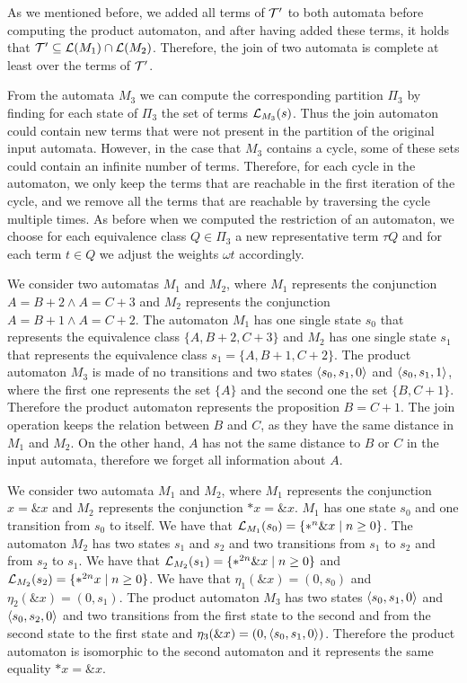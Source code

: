 As we mentioned before, we added all terms of $\mathcal{T}'$ to both automata before computing the product automaton, and after having added these terms, it holds that $\mathcal{T}' \subseteq \mathcal{L}(M_1) \cap \mathcal{L}(M_2)$.
Therefore, the join of two automata is complete at least over the terms of $\mathcal{T}'$.

From the automata $M_3$ we can compute the corresponding partition $\Pi_3$ by finding for each state of $\Pi_3$ the set of terms $\mathcal{L}_{M_3}(s)$.
Thus the join automaton could contain new terms that were not present in the partition of the original input automata.
However, in the case that $M_3$ contains a cycle, some of these sets could contain an infinite number of terms.
Therefore, for each cycle in the automaton, we only keep the terms that are reachable in the first iteration of the cycle, and we remove all the terms that are reachable by traversing the cycle multiple times.
As before when we computed the restriction of an automaton, we choose for each equivalence class $Q\in \Pi_3$ a new representative term $\tau Q$ and for each term $t \in Q$ we adjust the weights $\omega t$ accordingly.

\begin{example}
    We consider two automatas $M_1$ and $M_2$, where $M_1$ represents the conjunction $A = B + 2 \land A = C + 3$ and $M_2$ represents the conjunction $A = B + 1 \land A = C + 2$.
    The automaton $M_1$ has one single state $s_0$ that represents the equivalence class $\{A, B+2, C+3\}$
    and $M_2$ has one single state $s_1$ that represents the equivalence class $s_1 = \{A, B+1, C+2\}$.
    The product automaton $M_3$ is made of no transitions and two states $\langle s_0, s_1, 0\rangle$ and $\langle s_0, s_1, 1\rangle$, where the first one represents the set $\{A\}$ and the second one the set $\{B, C+1\}$.
    Therefore the product automaton represents the proposition $B = C + 1$.
    The join operation keeps the relation between $B$ and $C$, as they have the same distance in $M_1$ and $M_2$.
    On the other hand, $A$ has not the same distance to $B$ or $C$ in the input automata, therefore we forget all information about $A$.
\end{example}

\begin{example}\label{example:join-subset}
    We consider two automata $M_1$ and $M_2$, where $M_1$ represents the conjunction $x = \&x$ and $M_2$ represents the conjunction $*x = \&x$.
    $M_1$ has one state $s_0$ and one transition from $s_0$ to itself. We have that $\mathcal{L}_{M_1}(s_0) =\{*^n\&x\mid n \geq 0\}$.
    The automaton $M_2$ has two states $s_1$ and $s_2$ and two transitions from $s_1$ to $s_2$ and from $s_2$ to $s_1$. We have that $\mathcal{L}_{M_2}(s_1) = \{*^{2n}\&x\mid n \geq 0\}$ and $\mathcal{L}_{M_2}(s_2) = \{*^{2n}x\mid n \geq 0\}$.
    We have that $\eta_1(\&x) = (0, s_0)$ and $\eta_2 (\&x) = (0, s_1)$.
    The product automaton $M_3$ has two states $\langle s_0, s_1, 0\rangle$ and $\langle s_0, s_2, 0\rangle$ and two transitions from the first state to the second and from the second state to the first state and $\eta_3(\&x) = (0, \langle s_0, s_1, 0\rangle)$.
    Therefore the product automaton is isomorphic to the second automaton and it represents the same equality $*x = \&x$.
\end{example}

